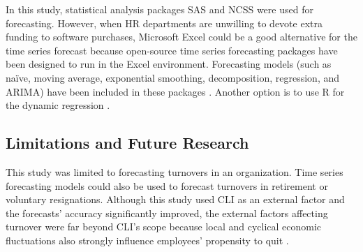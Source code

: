 In this study, statistical analysis packages SAS and NCSS were used for forecasting. However, when HR departments are unwilling to devote extra funding to software purchases, Microsoft Excel could be a good alternative for the time series forecast because open-source time series forecasting packages have been designed to run in the Excel environment. Forecasting models (such as naïve, moving average, exponential smoothing, decomposition, regression, and ARIMA) have been included in these packages  \citep{warren2008}. Another option is to use R for the dynamic regression \citep{hyndman2014}. 

\subsection{Limitations and Future Research}
This study was limited to forecasting turnovers in an organization. Time series forecasting models could also be used to forecast turnovers in retirement or voluntary resignations. Although this study used  CLI as an external factor and the forecasts' accuracy significantly improved, the external factors affecting turnover were far beyond CLI's scope because local and cyclical economic fluctuations also strongly influence employees' propensity to quit \citep{abelson1984}.

